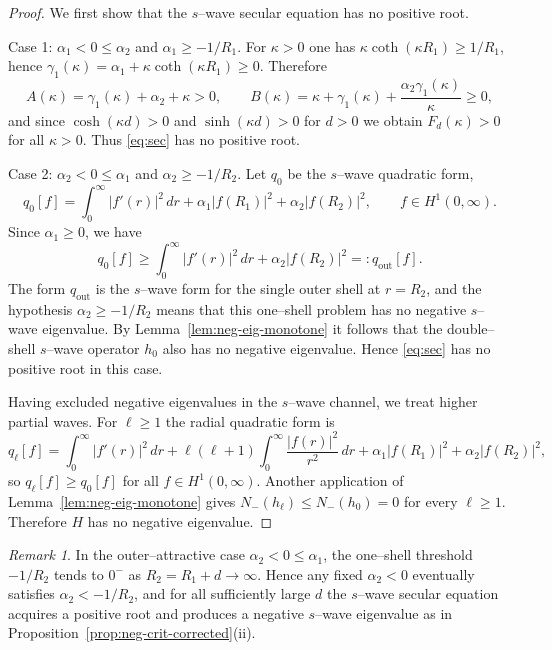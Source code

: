 \documentclass[a4paper,11pt]{article}
\numberwithin{equation}{section}
\theoremstyle{definition}
\theoremstyle{remark}
\newtheorem{rem}{Remark}
\begin{document}
\begin{proof}
We first show that the $s$--wave secular equation has no positive root.

\smallskip
\noindent
Case 1: $\alpha_1<0\le\alpha_2$ and $\alpha_1\ge-1/R_1$.
For $\kappa>0$ one has $\kappa\coth(\kappa R_1)\ge 1/R_1$, hence
$\gamma_1(\kappa)=\alpha_1+\kappa\coth(\kappa R_1)\ge0$.
Therefore
$$
A(\kappa)=\gamma_1(\kappa)+\alpha_2+\kappa>0,
\qquad
B(\kappa)=\kappa+\gamma_1(\kappa)+\frac{\alpha_2\gamma_1(\kappa)}{\kappa}\ge0,
$$
and since $\cosh(\kappa d)>0$ and $\sinh(\kappa d)>0$ for $d>0$ we obtain
$F_d(\kappa)>0$ for all $\kappa>0$.
Thus \eqref{eq:sec} has no positive root.

\smallskip
\noindent
Case 2: $\alpha_2<0\le\alpha_1$ and $\alpha_2\ge-1/R_2$.
Let $q_0$ be the $s$--wave quadratic form,
$$
q_0[f]=\int_0^\infty |f'(r)|^2\,dr+\alpha_1|f(R_1)|^2+\alpha_2|f(R_2)|^2,
\qquad f\in H^1(0,\infty).
$$
Since $\alpha_1\ge0$, we have
$$
q_0[f]
\ge
\int_0^\infty |f'(r)|^2\,dr+\alpha_2|f(R_2)|^2
=:q_{\mathrm{out}}[f].
$$
The form $q_{\mathrm{out}}$ is the $s$--wave form for the single outer shell at
$r=R_2$, and the hypothesis $\alpha_2\ge-1/R_2$ means that this one--shell
problem has no negative $s$--wave eigenvalue.
By Lemma~\ref{lem:neg-eig-monotone} it follows that the double--shell $s$--wave
operator $h_0$ also has no negative eigenvalue.
Hence \eqref{eq:sec} has no positive root in this case.

\smallskip
\noindent
Having excluded negative eigenvalues in the $s$--wave channel, we treat higher
partial waves.
For $\ell\ge1$ the radial quadratic form is
$$
q_\ell[f]
=
\int_0^\infty |f'(r)|^2\,dr
+ \ell(\ell+1)\int_0^\infty \frac{|f(r)|^2}{r^2}\,dr
+\alpha_1|f(R_1)|^2+\alpha_2|f(R_2)|^2,
$$
so $q_\ell[f]\ge q_0[f]$ for all $f\in H^1(0,\infty)$.
Another application of Lemma~\ref{lem:neg-eig-monotone} gives
$N_-(h_\ell)\le N_-(h_0)=0$ for every $\ell\ge1$.
Therefore $H$ has no negative eigenvalue.
\end{proof}

\begin{rem}\label{rem:outer-attractive-large-d}
In the outer--attractive case $\alpha_2<0\le\alpha_1$, the one--shell threshold
$-1/R_2$ tends to $0^-$ as $R_2=R_1+d\to\infty$.
Hence any fixed $\alpha_2<0$ eventually satisfies $\alpha_2<-1/R_2$, and for all
sufficiently large $d$ the $s$--wave secular equation acquires a positive root
and produces a negative $s$--wave eigenvalue as in
Proposition~\ref{prop:neg-crit-corrected}(ii).
\end{rem}
\end{document}
